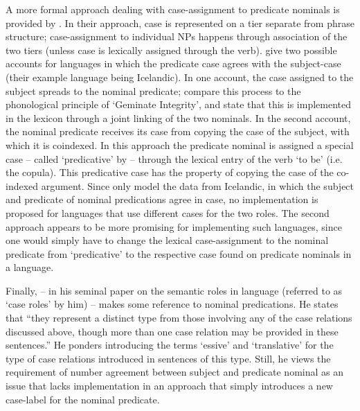 A more formal approach dealing with case-assignment to predicate nominals is provided by \citet[243--246]{Yip:1987}.
In their approach, case is represented on a tier separate from phrase structure; case-assignment to individual NPs happens through association of the two tiers (unless case is lexically assigned through the verb). 
\citeauthor{Yip:1987} give two possible accounts for languages in which the predicate case agrees with the subject-case (their example language being Icelandic). 
In one account, the case assigned to the subject spreads to the nominal predicate; \citeauthor{Yip:1987} compare this process to the phonological principle of `Geminate Integrity', and state that this is implemented in the lexicon through a joint linking of the two nominals.  
In the second account, the nominal predicate receives its case from copying the case of the subject, with which it is coindexed. 
In this approach the predicate nominal is assigned a special case -- called `predicative' by \citet{Yip:1987} --  through the lexical entry of the verb `to be' (i.e. the copula). 
This predicative case has the property of copying the case of the co-indexed argument.  
Since \citet{Yip:1987} only model the data from Icelandic, in which the subject and predicate of nominal predications agree in case, no implementation is proposed for languages that use different cases for the two roles. 
The second approach appears to be more promising for implementing such languages, since one would simply have to change the lexical case-assignment to the nominal predicate from `predicative' to the respective case found on predicate nominals in a language.

Finally, \citet[84]{Fillmore:1969} -- in his seminal paper on the semantic roles in language (referred to as `case roles' by him) -- makes some reference to nominal predications. 
He states that ``they represent a distinct type from those involving any of the case relations discussed above, though more than one case relation may be provided in these sentences.'' 
He ponders introducing the terms `essive' and `translative' for the type of case relations introduced in sentences of this type. 
Still, he views the requirement of number agreement between subject and predicate nominal as an issue that lacks implementation in an approach that simply introduces a new case-label for the nominal predicate. 

